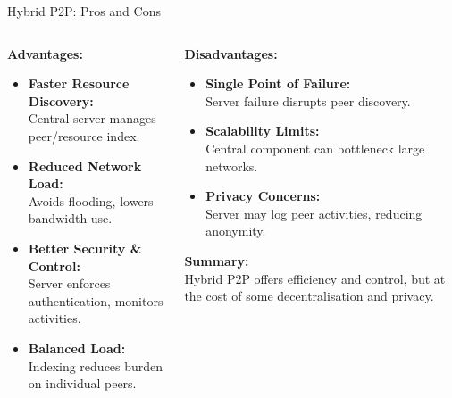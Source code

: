 \documentclass[aspectratio=169, table]{beamer}
\begin{document}
\begin{frame}{Hybrid P2P: Pros and Cons}
	\vspace{20pt}
	\begin{columns}[t]
		
		\begin{column}{0.5\textwidth}
			\textbf{Advantages:}
			\begin{itemize}
				\item \textbf{Faster Resource Discovery:} \\
				Central server manages peer/resource index.
				
				\item \textbf{Reduced Network Load:} \\
				Avoids flooding, lowers bandwidth use.
				
				\item \textbf{Better Security \& Control:} \\
				Server enforces authentication, monitors activities.
				
				\item \textbf{Balanced Load:} \\
				Indexing reduces burden on individual peers.
			\end{itemize}
		\end{column}
		
		\begin{column}{0.5\textwidth}
			\textbf{Disadvantages:}
			\begin{itemize}
				\item \textbf{Single Point of Failure:} \\
				Server failure disrupts peer discovery.
				
				\item \textbf{Scalability Limits:} \\
				Central component can bottleneck large networks.
				
				\item \textbf{Privacy Concerns:} \\
				Server may log peer activities, reducing anonymity.
			\end{itemize}
			
			\vspace{10pt}
			\textbf{Summary:} \\
			Hybrid P2P offers efficiency and control, but at the cost of some decentralisation and privacy.
		\end{column}
		
	\end{columns}
\end{frame}
\end{document}
